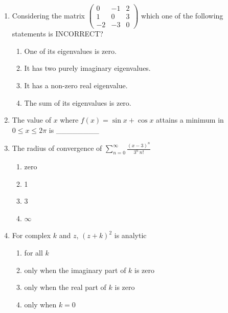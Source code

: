 \documentclass[journal,12pt,onecolumn]{IEEEtran}
\newcommand{\myvec}[1]{\begin{pmatrix}#1\end{pmatrix}}
\begin{document}
\begin{enumerate}[label=\arabic*)]

\item Considering the matrix
$\myvec{ 0 & -1 & 2 \\ 1 & 0 & 3 \\ -2 & -3 & 0}$
which one of the following statements is INCORRECT?
\vspace{0.2cm}
\hfill{} \\

\begin{enumerate}[label=\alph*)]
\item One of its eigenvalues is zero.
\item It has two purely imaginary eigenvalues.
\item It has a non-zero real eigenvalue.
\item The sum of its eigenvalues is zero.
\end{enumerate}

\vspace{0.5cm}

\item The value of $x$ where $f(x) = \sin{x} + \cos{x}$ attains a minimum in $0 \le x \le 2\pi$ is \_\_\_\_\_\_\_\_
\vspace{0.2cm}
\hfill{} \\

\vspace{0.5cm}

\item The radius of convergence of $\sum_{n=0}^\infty \frac{(x-3)^n}{3^n\,n!}$  
\hfill{} \\

\vspace{0.2cm}
\begin{enumerate}[label=\alph*)]
\item zero
\item 1
\item 3
\item $\infty$
\end{enumerate}

\vspace{0.5cm}

\item For complex $k$ and $z$, $(z+k)^2$ is analytic  
\hfill{} \\

\vspace{0.2cm}
\begin{enumerate}[label=\alph*)]
\item for all $k$
\item only when the imaginary part of $k$ is zero
\item only when the real part of $k$ is zero
\item only when $k=0$
\end{enumerate}


\end{enumerate}
\end{document}
